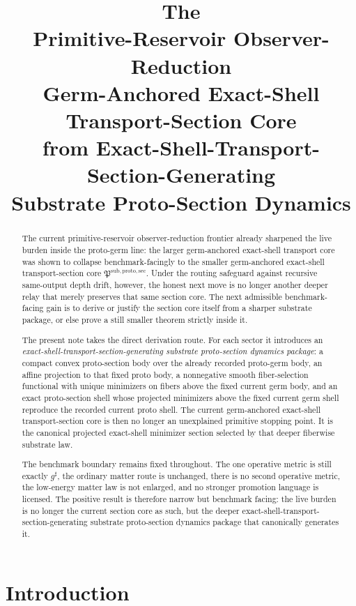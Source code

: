 \documentclass[11pt]{article}
\title{\textbf{The \TheoryName{}}\\[0.4em]
\large Primitive-Reservoir Observer-Reduction\\
\large Germ-Anchored Exact-Shell Transport-Section Core\\
\large from Exact-Shell-Transport-Section-Generating\\
\large Substrate Proto-Section Dynamics}
\author{}
\date{}
\newcommand{\CompletedMetric}{g^{\sharp}}
\newcommand{\ProtoSectionCore}{\mathfrak P^{\mathrm{sub,proto,sec}}}
\begin{document}
\maketitle

\begin{abstract}
The current primitive-reservoir observer-reduction frontier already sharpened the live burden inside the proto-germ line: the larger germ-anchored exact-shell transport core was shown to collapse benchmark-facingly to the smaller germ-anchored exact-shell transport-section core \(\ProtoSectionCore\). Under the routing safeguard against recursive same-output depth drift, however, the honest next move is no longer another deeper relay that merely preserves that same section core. The next admissible benchmark-facing gain is to derive or justify the section core itself from a sharper substrate package, or else prove a still smaller theorem strictly inside it.

The present note takes the direct derivation route. For each sector it introduces an \emph{exact-shell-transport-section-generating substrate proto-section dynamics package}: a compact convex proto-section body over the already recorded proto-germ body, an affine projection to that fixed proto body, a nonnegative smooth fiber-selection functional with unique minimizers on fibers above the fixed current germ body, and an exact proto-section shell whose projected minimizers above the fixed current germ shell reproduce the recorded current proto shell. The current germ-anchored exact-shell transport-section core is then no longer an unexplained primitive stopping point. It is the canonical projected exact-shell minimizer section selected by that deeper fiberwise substrate law.

The benchmark boundary remains fixed throughout. The one operative metric is still exactly \(\CompletedMetric\), the ordinary matter route is unchanged, there is no second operative metric, the low-energy matter law is not enlarged, and no stronger promotion language is licensed. The positive result is therefore narrow but benchmark facing: the live burden is no longer the current section core as such, but the deeper exact-shell-transport-section-generating substrate proto-section dynamics package that canonically generates it.
\end{abstract}

\section{Introduction}
\end{document}
